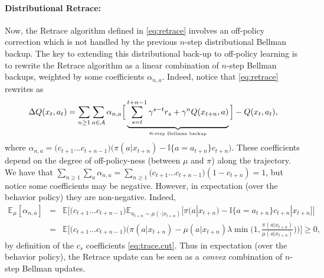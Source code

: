\documentclass{article}
\newcommand{\beqan}{\begin{eqnarray*}}
\newcommand{\eeqan}{\end{eqnarray*}}
\newcommand{\E}{{\mathbb E}}
\begin{document}
\paragraph{Distributional Retrace:} Now, the Retrace algorithm defined in 
\eqref{eq:retrace} involves an off-policy correction which is not handled by the 
previous $n$-step distributional Bellman backup. The key to extending this 
distributional back-up to off-policy learning is to rewrite the Retrace algorithm as a linear 
combination 
of $n$-step Bellman backups, weighted by some coefficients $\alpha_{n,a} $. 
Indeed, notice that \eqref{eq:retrace} rewrites as
\beqan
\Delta Q(x_t, a_t) = \sum_{n\geq 1} \sum_{a\in \mathcal{A}} \alpha_{n,a} \Big[ 
\underbrace{ \sum_{s=t}^{t+n-1} 
\gamma^{s-t} r_s + \gamma^n Q(x_{t+n},a)}_{n\mbox{\tiny -step Bellman backup}} 
\Big] - Q(x_t, a_t),
\eeqan
where $\alpha_{n,a} = \big(c_{t+1}\dots c_{t+n-1}\big) \big( \pi(a|x_{t+n}) - 
{\mathbb I}\{a=a_{t+n}\} c_{t+n}\big)$. These coefficients depend on the degree 
of off-policy-ness (between $\mu$ and $\pi$) along the trajectory. We have that 
$\sum_{n\geq 1}\sum_a \alpha_{n,a} = \sum_{n\geq 1} \big(c_{t+1}\dots c_{t+n-1}\big) (1 - 
c_{t+n}) = 1$, but notice some coefficients may be negative. However, in 
expectation (over the behavior policy) they are non-negative. Indeed, 
\beqan
\E_{\mu}[\alpha_{n,a}] &=& \E\Big[\big(c_{t+1}\dots c_{t+n-1}\big) 
\E_{a_{t+n}\sim\mu(\cdot|x_{t+n})}\big[ \pi(a|x_{t+n}) - {\mathbb 
I}\{a=a_{t+n}\}c_{t+n} |x_{t+n}\big] \Big] \\
&=& \E\Big[\big(c_{t+1}\dots c_{t+n-1}\big)  \Big( \pi(a|x_{t+n}) - 
\mu(a|x_{t+n}) \lambda \min\big(1, 
\frac{\pi(a|x_{t+n})}{\mu(a|x_{t+n})}\big)\Big) 
\Big]\geq 0,
\eeqan
by definition of the $c_s$ coefficients \eqref{eq:trace.cut}. 
Thus in expectation (over the behavior policy), the Retrace update can be seen 
as a {\em convex} combination of $n$-step Bellman updates.
\end{document}
